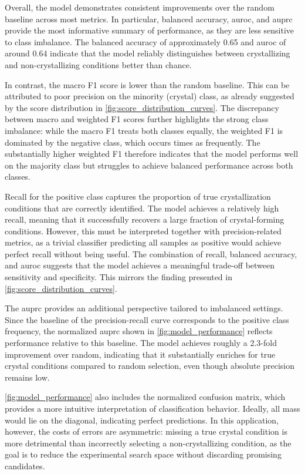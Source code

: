 Overall, the model demonstrates consistent improvements over the random baseline across most metrics. In particular, balanced accuracy, \gls{auroc}, and \gls{auprc} provide the most informative summary of performance, as they are less sensitive to class imbalance. The balanced accuracy of approximately 0.65 and \gls{auroc} of around 0.64 indicate that the model reliably distinguishes between crystallizing and non-crystallizing conditions better than chance.

In contrast, the macro F1 score is lower than the random baseline. This can be attributed to poor precision on the minority (crystal) class, as already suggested by the score distribution in \autoref{fig:score_distribution_curves}. The discrepancy between macro and weighted F1 scores further highlights the strong class imbalance: while the macro F1 treats both classes equally, the weighted F1 is dominated by the negative class, which occurs  times as frequently. The substantially higher weighted F1 therefore indicates that the model performs well on the majority class but struggles to achieve balanced performance across both classes.

Recall for the positive class captures the proportion of true crystallization conditions that are correctly identified. The model achieves a relatively high recall, meaning that it successfully recovers a large fraction of crystal-forming conditions. However, this must be interpreted together with precision-related metrics, as a trivial classifier predicting all samples as positive would achieve perfect recall without being useful. The combination of recall, balanced accuracy, and \gls{auroc} suggests that the model achieves a meaningful trade-off between sensitivity and specificity. This mirrors the finding presented in \autoref{fig:score_distribution_curves}.

The \gls{auprc} provides an additional perspective tailored to imbalanced settings. Since the baseline of the precision-recall curve corresponds to the positive class frequency, the normalized \gls{auprc} shown in \autoref{fig:model_performance} reflects performance relative to this baseline. The model achieves roughly a 2.3-fold improvement over random, indicating that it substantially enriches for true crystal conditions compared to random selection, even though absolute precision remains low.

\autoref{fig:model_performance} also includes the normalized confusion matrix, which provides a more intuitive interpretation of classification behavior. Ideally, all mass would lie on the diagonal, indicating perfect predictions. In this application, however, the costs of errors are asymmetric: missing a true crystal condition is more detrimental than incorrectly selecting a non-crystallizing condition, as the goal is to reduce the experimental search space without discarding promising candidates.

